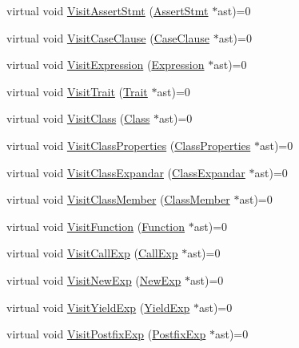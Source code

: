 \begin{DoxyCompactItemize}
\item 
virtual void \hyperlink{classmocha_1_1_i_visitor_a3eecdb76da0562ca8d92f1b892c10aff}{VisitAssertStmt} (\hyperlink{classmocha_1_1_assert_stmt}{AssertStmt} $\ast$ast)=0
\item 
virtual void \hyperlink{classmocha_1_1_i_visitor_a39a05d301d19ff9b970bdac2c4ccf967}{VisitCaseClause} (\hyperlink{classmocha_1_1_case_clause}{CaseClause} $\ast$ast)=0
\item 
virtual void \hyperlink{classmocha_1_1_i_visitor_a63d5b63beb04f227b4a12c6eabaad2b1}{VisitExpression} (\hyperlink{classmocha_1_1_expression}{Expression} $\ast$ast)=0
\item 
virtual void \hyperlink{classmocha_1_1_i_visitor_a171f40840534c3df77982edc62907d05}{VisitTrait} (\hyperlink{classmocha_1_1_trait}{Trait} $\ast$ast)=0
\item 
virtual void \hyperlink{classmocha_1_1_i_visitor_ad1eb9c5542fc43146ce9f2d70749d22f}{VisitClass} (\hyperlink{classmocha_1_1_class}{Class} $\ast$ast)=0
\item 
virtual void \hyperlink{classmocha_1_1_i_visitor_aa9ff0a7c45fe6fc13649abb27e9edee3}{VisitClassProperties} (\hyperlink{classmocha_1_1_class_properties}{ClassProperties} $\ast$ast)=0
\item 
virtual void \hyperlink{classmocha_1_1_i_visitor_a5984b0947e91f6d1288635c315deb0ff}{VisitClassExpandar} (\hyperlink{classmocha_1_1_class_expandar}{ClassExpandar} $\ast$ast)=0
\item 
virtual void \hyperlink{classmocha_1_1_i_visitor_a34db2b8b0346be749d260a65de3b5370}{VisitClassMember} (\hyperlink{classmocha_1_1_class_member}{ClassMember} $\ast$ast)=0
\item 
virtual void \hyperlink{classmocha_1_1_i_visitor_aeace77706a0ab833dbe84a702e41ae5f}{VisitFunction} (\hyperlink{classmocha_1_1_function}{Function} $\ast$ast)=0
\item 
virtual void \hyperlink{classmocha_1_1_i_visitor_a361bd13467e5cafbf94665265fb72a71}{VisitCallExp} (\hyperlink{classmocha_1_1_call_exp}{CallExp} $\ast$ast)=0
\item 
virtual void \hyperlink{classmocha_1_1_i_visitor_a253ed9edb9b737342786f7920f430141}{VisitNewExp} (\hyperlink{classmocha_1_1_new_exp}{NewExp} $\ast$ast)=0
\item 
virtual void \hyperlink{classmocha_1_1_i_visitor_a77b64a6ca7c9fae7988b97a6bb2e9166}{VisitYieldExp} (\hyperlink{classmocha_1_1_yield_exp}{YieldExp} $\ast$ast)=0
\item 
virtual void \hyperlink{classmocha_1_1_i_visitor_afb868d56168e3250b83daab11f2d3ac2}{VisitPostfixExp} (\hyperlink{classmocha_1_1_postfix_exp}{PostfixExp} $\ast$ast)=0

\end{DoxyCompactItemize}
